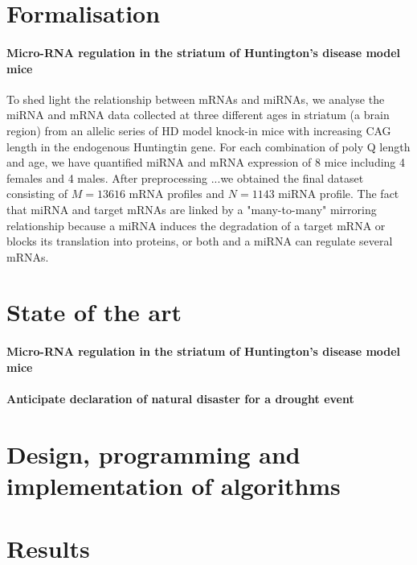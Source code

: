 \section{Formalisation}

\paragraph{Micro-RNA regulation in the striatum of Huntington’s disease model mice}
To shed light the relationship between mRNAs and miRNAs, we analyse the miRNA and mRNA data collected at three different ages in striatum (a brain region) from an allelic series of HD model knock-in mice with increasing CAG length in the endogenous Huntingtin gene. For each combination of poly Q length and age, we have quantified miRNA and mRNA expression of 8 mice including 4 females and 4 males. After preprocessing ...we obtained the final dataset consisting of $M= 13 616$ mRNA profiles and $N=1143$ miRNA profile. The fact that miRNA and target mRNAs are linked by a "many-to-many" mirroring relationship because a miRNA induces the degradation of a target mRNA or blocks its translation into proteins, or both and a miRNA can regulate several mRNAs. 

\section{State of the art}

\paragraph{Micro-RNA regulation in the striatum of Huntington’s disease model mice}

\paragraph{Anticipate declaration of natural disaster for a drought event}


\section{Design, programming and implementation of algorithms}
\section{Results}
